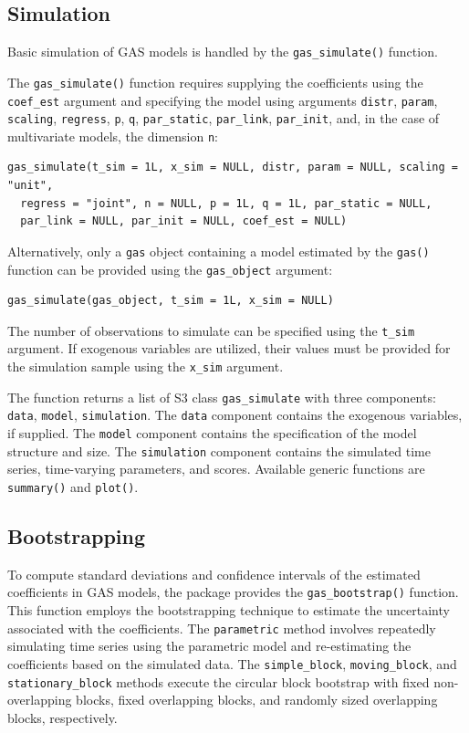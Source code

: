 \subsection{Simulation}\label{simulation}

Basic simulation of GAS models is handled by the \texttt{gas\_simulate()} function.

The \texttt{gas\_simulate()} function requires supplying the coefficients using the \texttt{coef\_est} argument and specifying the model using arguments \texttt{distr}, \texttt{param}, \texttt{scaling}, \texttt{regress}, \texttt{p}, \texttt{q}, \texttt{par\_static}, \texttt{par\_link}, \texttt{par\_init}, and, in the case of multivariate models, the dimension \texttt{n}:

\begin{verbatim}
gas_simulate(t_sim = 1L, x_sim = NULL, distr, param = NULL, scaling = "unit",
  regress = "joint", n = NULL, p = 1L, q = 1L, par_static = NULL,
  par_link = NULL, par_init = NULL, coef_est = NULL)
\end{verbatim}

Alternatively, only a \texttt{gas} object containing a model estimated by the \texttt{gas()} function can be provided using the \texttt{gas\_object} argument:

\begin{verbatim}
gas_simulate(gas_object, t_sim = 1L, x_sim = NULL)
\end{verbatim}

The number of observations to simulate can be specified using the \texttt{t\_sim} argument. If exogenous variables are utilized, their values must be provided for the simulation sample using the \texttt{x\_sim} argument.

The function returns a list of S3 class \texttt{gas\_simulate} with three components: \texttt{data}, \texttt{model}, \texttt{simulation}. The \texttt{data} component contains the exogenous variables, if supplied. The \texttt{model} component contains the specification of the model structure and size. The \texttt{simulation} component contains the simulated time series, time-varying parameters, and scores. Available generic functions are \texttt{summary()} and \texttt{plot()}.

\subsection{Bootstrapping}\label{bootstrapping}

To compute standard deviations and confidence intervals of the estimated coefficients in GAS models, the package provides the \texttt{gas\_bootstrap()} function. This function employs the bootstrapping technique to estimate the uncertainty associated with the coefficients. The \texttt{parametric} method involves repeatedly simulating time series using the parametric model and re-estimating the coefficients based on the simulated data. The \texttt{simple\_block}, \texttt{moving\_block}, and \texttt{stationary\_block} methods execute the circular block bootstrap with fixed non-overlapping blocks, fixed overlapping blocks, and randomly sized overlapping blocks, respectively.

